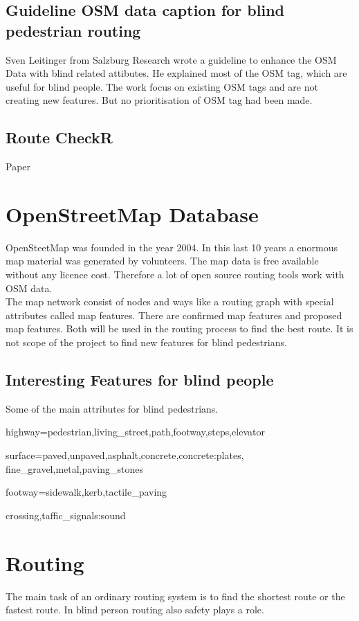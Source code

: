 \documentclass{sig-alternate}
\begin{document}
\subsection{Guideline OSM data caption for blind pedestrian routing}
Sven Leitinger\cite{sven:osm} from Salzburg Research wrote a guideline to enhance the OSM Data with blind related attibutes. He explained most of the OSM tag, which are useful for blind people. The work focus on existing OSM tags and are not creating new features. But no prioritisation of OSM tag had been made. 
\subsection{Route CheckR}
Paper\cite{Volkel:2008}

\section{OpenStreetMap Database}
OpenSteetMap was founded in the year 2004. In this last 10 years a enormous map material was generated by volunteers. The map data is free available without any licence cost. Therefore a lot of open source routing tools work with OSM data. \\
The map network consist of nodes and ways like a routing graph with special attributes called map features. There are confirmed map features and proposed map features.  Both will be used in the routing process to find the best route. It is not scope of the project to find new features for blind pedestrians.   

\subsection{Interesting Features for blind people}
Some of the main attributes for blind pedestrians.
\begin{description}
  \item highway=pedestrian,living\_street,path,footway,steps,elevator
  \item surface=paved,unpaved,asphalt,concrete,concrete:plates, fine\_gravel,metal,paving\_stones
  \item footway=sidewalk,kerb,tactile\_paving
  \item crossing,taffic\_signals:sound  
\end{description}

\section{Routing}
The main task of an ordinary routing system is to find the shortest route or the fastest route. In blind person routing also safety plays a role.
\end{document}
